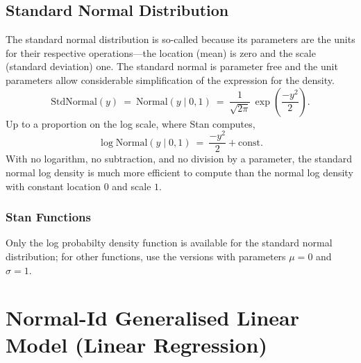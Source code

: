 \begin{description}
\begin{description}    \end{description}


\subsection{Standard Normal Distribution}


The standard normal distribution is so-called because its parameters are the units for their respective operations---the location (mean) is zero and the scale (standard deviation) one.  The standard normal is parameter free and the unit parameters allow considerable simplification of the expression for the density. \[ \text{StdNormal}(y) \ = \ \text{Normal}(y \mid 0, 1) \ = \ \frac{1}{\sqrt{2 \pi}} \, \exp \left( \frac{-y^2}{2} \right)\!. \] Up to a proportion on the log scale, where Stan computes, \[ \log \text{Normal}(y \mid 0, 1) \ = \ \frac{-y^2}{2} + \text{const}. \] With no logarithm, no subtraction, and no division by a parameter, the standard normal log density is much more efficient to compute than the normal log density with constant location $0$ and scale $1$.


\subsubsection{Stan Functions}


Only the log probabilty density function is available for the standard normal distribution; for other functions, use the  versions with parameters $\mu = 0$ and $\sigma = 1$.


\begin{description}  \end{description}




\section{Normal-Id Generalised Linear Model (Linear Regression)}\label{normal-id-glm.section}



\end{description}

